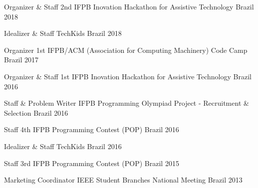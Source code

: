 

\begin{cvhonors}

  \cvhonor
    {Organizer \& Staff} %
    {2nd IFPB Inovation Hackathon for Assistive Technology} %
    {Brazil} %
    {2018} %

  \cvhonor
    {Idealizer \& Staff} %
    {TechKids} %
    {Brazil} %
    {2018} %

\cvhonor
    {Organizer} %
    {1st IFPB/ACM (Association for Computing Machinery) Code Camp} %
    {Brazil} %
    {2017} %
    
  \cvhonor
    {Organizer \& Staff} %
    {1st IFPB Inovation Hackathon for Assistive Technology} %
    {Brazil} %
    {2016} %

  \cvhonor
    {Staff \& Problem Writer} %
    {IFPB Programming Olympiad Project - Recruitment \& Selection} %
    {Brazil} %
    {2016} %
    
  \cvhonor
    {Staff} %
    {4th IFPB Programming Contest (POP)} %
    {Brazil} %
    {2016} %
    
  \cvhonor
    {Idealizer \& Staff} %
    {TechKids} %
    {Brazil} %
    {2016} %

  \cvhonor
    {Staff} %
    {3rd IFPB Programming Contest (POP)} %
    {Brazil} %
    {2015} %

  \cvhonor
    {Marketing Coordinator} %
    {IEEE Student Branches National Meeting} %
    {Brazil} %
    {2013} %
    

\end{cvhonors}
